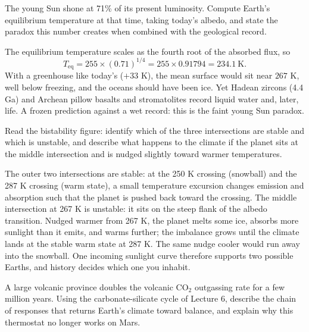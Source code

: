 \parti The young Sun shone at 71\% of its present luminosity.
Compute Earth's equilibrium temperature at that time, taking today's albedo,
and state the paradox this number creates
when combined with the geological record.

\begin{solution}
The equilibrium temperature scales as the fourth root of the absorbed flux, so
\[
T_{\mathrm{eq}} = 255 \times (0.71)^{1/4} = 255 \times 0.91794 = 234.1\ \mathrm{K}.
\]
With a greenhouse like today's ($+33$ K), the mean surface would sit near
$267$ K, well below freezing, and the oceans should have been ice.
Yet Hadean zircons (4.4 Ga) and Archean pillow basalts and stromatolites record liquid water and, later, life.
A frozen prediction against a wet record: this is the faint young Sun paradox.
\end{solution}

\parti Read the bistability figure: identify which of the three intersections are stable and which is
unstable, and describe what happens to the climate if the planet sits at the middle intersection and is
nudged slightly toward warmer temperatures.

\begin{solution}
The outer two intersections are stable: at the 250 K crossing (snowball) and the 287 K crossing (warm
state), a small temperature excursion changes emission and absorption such that the planet is pushed
back toward the crossing.
The middle intersection at 267 K is unstable: it sits on the steep flank of the albedo transition.
Nudged warmer from 267 K, the planet melts some ice, absorbs more sunlight than it emits, and warms
further; the imbalance grows until the climate lands at the stable warm state at 287 K.
The same nudge cooler would run away into the snowball.
One incoming sunlight curve therefore supports two possible Earths, and history decides which one you
inhabit.
\end{solution}

\parti A large volcanic province doubles the volcanic $\mathrm{CO_2}$ outgassing rate for a few million
years. Using the carbonate-silicate cycle of Lecture 6, describe the chain of responses that returns
Earth's climate toward balance, and explain why this thermostat no longer works on Mars.

